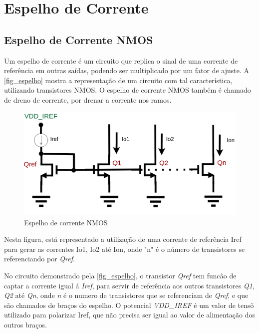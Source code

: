 \section{Espelho de Corrente}
\label{anexoespelhos}

\subsection{Espelho de Corrente NMOS}

Um espelho de corrente \'e um circuito que replica o sinal de uma corrente de refer\^encia em outras sa\'idas, podendo ser multiplicado por um fator de ajuste. A \autoref{fig_espelho} mostra a representa{\c c}\~ao de um circuito com tal caracter\'istica, utilizando transistores NMOS. O espelho de corrente NMOS tamb\'em \'e chamado de dreno de corrente, por drenar a corrente nos ramos.

\begin{figure}[htb]
    \label{fig_espelho}
    \centering
    \caption{Espelho de corrente NMOS} 
    \includegraphics[scale=0.4]{Circuitos/current_mirror_example.png}
\end{figure}

Nesta figura, est\'a representado a utiliza{\c c}\~ao de uma corrente de refer\^encia Iref para gerar as correntes Io1, Io2 at\'e Ion, onde "n" \'e o n\'umero de transistores se referenciando por \emph{Qref}.

No circuito demonstrado pela \autoref{fig_espelho}, o transistor \emph{Qref} tem func\^ao de captar a corrente igual \'a \emph{Iref}, para servir de refer\^encia aos outros transistores \emph{Q1}, \emph{Q2} at\'e \emph{Qn}, onde \emph{n} \'e o numero de transistores que se referenciam de \emph{Qref}, e que s\~ao chamados de bra{\c c}os do espelho. O potencial \emph{VDD\_IREF} \'e um valor de tens\~o utilizado para polarizar Iref, que n\~ao precisa ser igual ao valor de alimenta{\c c}\~ao dos outros bra{\c c}os.

